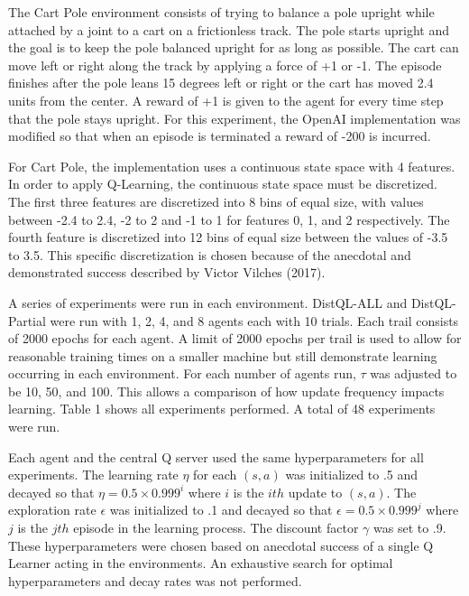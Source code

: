 \documentclass[jair,twoside,11pt,theapa]{article}
\begin{document}
The Cart Pole environment consists of trying to balance a pole upright while attached by a joint to a cart on a frictionless track. The pole starts upright and the goal is to keep the pole balanced upright for as long as possible. The cart can move left or right along the track by applying a force of +1 or -1. The episode finishes after the pole leans 15 degrees left or right or the cart has moved 2.4 units from the center. A reward of +1 is given to the agent for every time step that the pole stays upright. For this experiment, the OpenAI implementation was modified so that when an episode is terminated a reward of -200 is incurred. 

For Cart Pole, the implementation uses a continuous state space with 4 features. In order to apply Q-Learning, the continuous state space must be discretized. The first three features are discretized into 8 bins of equal size, with values between -2.4 to 2.4, -2 to 2 and -1 to 1 for features 0, 1, and 2 respectively. The fourth feature is discretized into 12 bins of equal size between the values of -3.5 to 3.5. This specific discretization is chosen because of the anecdotal and demonstrated success described by Victor Vilches (2017)\nocite{Victor:github}. 

A series of experiments were run in each environment. DistQL-ALL and DistQL-Partial were run with 1, 2, 4, and 8 agents each with 10 trials. Each trail consists of 2000 epochs for each agent. A limit of 2000 epochs per trail is used to allow for reasonable training times on a smaller machine but still demonstrate learning occurring in each environment. For each number of agents run, $\tau$ was adjusted to be 10, 50, and 100. This allows a comparison of how update frequency impacts learning. Table 1 shows all experiments performed. A total of 48 experiments were run. 

Each agent and the central Q server used the same hyperparameters for all experiments. The learning rate $\eta$ for each $(s,a)$ was initialized to .5 and decayed so that $\eta = 0.5 \times 0.999^i$ where $i$ is the $ith$ update to $(s,a)$. The exploration rate $\epsilon$ was initialized to .1 and decayed so that $\epsilon = 0.5 \times 0.999^j$ where $j$ is the $jth$ episode in the learning process. The discount factor $\gamma$ was set to .9. These hyperparameters were chosen based on anecdotal success of a single Q Learner acting in the environments. An exhaustive search for optimal hyperparameters and decay rates was not performed. 
\end{document}
